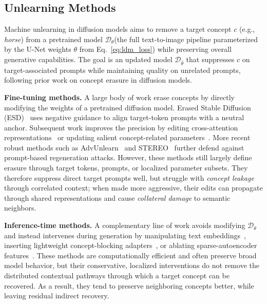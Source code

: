 \subsection{Unlearning Methods}
Machine unlearning in diffusion models aims to remove a target concept $c$ (e.g., \textit{horse}) from a pretrained model $\mathcal{D}_\theta$(the full text-to-image pipeline parameterized by the U-Net weights $\theta$ from Eq.~\ref{eq:ldm_loss}) 
while preserving overall generative capabilities. The goal is an updated model $\mathcal{D}_{\hat{\theta}}$ that suppresses $c$ on target-associated prompts while maintaining quality on unrelated prompts, following prior work on concept erasure in diffusion models. 

\textbf{Fine-tuning methods.}
A large body of work erase concepts by directly modifying the weights of a pretrained diffusion model. Erased Stable Diffusion (ESD)~\cite{gandikota2023erasing} uses negative guidance to align target-token prompts with a neutral anchor. Subsequent work improves the precision by editing cross-attention representations~\citep{wang2025ace} or updating salient concept-related parameters~\citep{fan2023salun,wu2024scissorhands}. More recent robust methods such as AdvUnlearn~\cite{zhang2024defensive} and STEREO~\cite{srivatsan2025stereo} further defend against prompt-based regeneration attacks.
However, these methods still largely define erasure through target tokens, prompts, or localized parameter subsets. They therefore suppress direct target prompts well, but struggle with \emph{concept leakage} through correlated context; when made more aggressive, their edits can propagate through shared representations and cause \emph{collateral damage} to semantic neighbors.

\textbf{Inference-time methods.}
A complementary line of work avoids modifying $\mathcal{D}_{\theta}$ and instead intervenes during generation by manipulating text embeddings~\citep{li2024get}, inserting lightweight concept-blocking adapters~\citep{lyu2024one}, or ablating sparse-autoencoder features~\citep{cywinski2025saeuron}. These methods are computationally efficient and often preserve broad model behavior, but their conservative, localized interventions do not remove the distributed contextual pathways through which a target concept can be recovered. As a result, they tend to preserve neighboring concepts better, while leaving residual indirect recovery.

